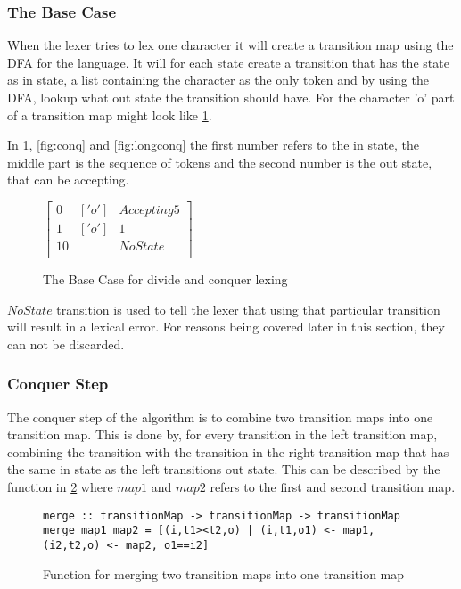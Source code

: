 \subsubsection{The Base Case}
When the lexer tries to lex one character it will create a transition
map using the DFA for the language. It will for each state create a transition
that has the state as in state, a list containing the character as the only
token and by using the DFA, lookup what out state the transition should have.
For the character 'o' part of a transition map might look like \cref{fig:bascas}.

In \cref{fig:bascas}, \cref{fig:conq} and \cref{fig:longconq} the first number
refers to the in state, the middle part is the sequence of tokens and the second
number is the out state, that can be accepting.

\begin{figure}[!ht]
\begin{center}
$\left[\begin{array}{ccc}
0&['o']&Accepting 5\\
1&['o']&1\\
10& &NoState\\
\end{array}\right]$
\caption{The Base Case for divide and conquer lexing \label{fig:bascas}}
\end{center}
\end{figure}

$NoState$ transition is used to tell the lexer that using that particular 
transition will result in a lexical error. For reasons being covered later in
this section, they can not be discarded.

\subsubsection{Conquer Step}
The conquer step of the algorithm is to combine two transition maps into one
transition map. This is done by, for every transition in the left transition
map, combining the transition with the transition in the right transition map
that has the same in state as the left transitions out state. This can be
described by the function in \cref{fig:mergetransmap} where $map1$ and $map2$
refers to the first and second transition map.

\begin{figure}
\begin{lstlisting}
merge :: transitionMap -> transitionMap -> transitionMap
merge map1 map2 = [(i,t1><t2,o) | (i,t1,o1) <- map1, (i2,t2,o) <- map2, o1==i2]
\end{lstlisting}
\caption{Function for merging two transition maps into one transition map
  \label{fig:mergetransmap}}
\end{figure}

